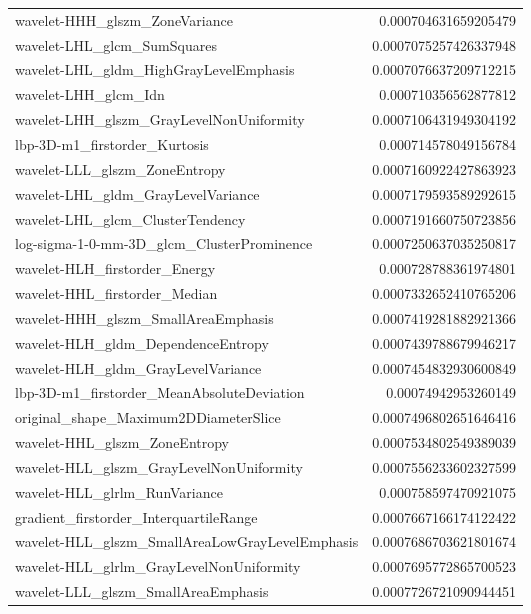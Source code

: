 {\begin{xltabular}[H]{\textwidth}{X r}
        wavelet-HHH\_glszm\_ZoneVariance & 0.000704631659205479 \\
        wavelet-LHL\_glcm\_SumSquares & 0.0007075257426337948 \\
        wavelet-LHL\_gldm\_HighGrayLevelEmphasis & 0.0007076637209712215 \\
        wavelet-LHH\_glcm\_Idn & 0.000710356562877812 \\
        wavelet-LHH\_glszm\_GrayLevelNonUniformity & 0.0007106431949304192 \\
        lbp-3D-m1\_firstorder\_Kurtosis & 0.000714578049156784 \\
        wavelet-LLL\_glszm\_ZoneEntropy & 0.0007160922427863923 \\
        wavelet-LHL\_gldm\_GrayLevelVariance & 0.0007179593589292615 \\
        wavelet-LHL\_glcm\_ClusterTendency & 0.0007191660750723856 \\
        log-sigma-1-0-mm-3D\_glcm\_ClusterProminence & 0.0007250637035250817 \\
        wavelet-HLH\_firstorder\_Energy & 0.000728788361974801 \\
        wavelet-HHL\_firstorder\_Median & 0.0007332652410765206 \\
        wavelet-HHH\_glszm\_SmallAreaEmphasis & 0.0007419281882921366 \\
        wavelet-HLH\_gldm\_DependenceEntropy & 0.0007439788679946217 \\
        wavelet-HLH\_gldm\_GrayLevelVariance & 0.0007454832930600849 \\
        lbp-3D-m1\_firstorder\_MeanAbsoluteDeviation & 0.00074942953260149 \\
        original\_shape\_Maximum2DDiameterSlice & 0.0007496802651646416 \\
        wavelet-HHL\_glszm\_ZoneEntropy & 0.0007534802549389039 \\
        wavelet-HLL\_glszm\_GrayLevelNonUniformity & 0.0007556233602327599 \\
        wavelet-HLL\_glrlm\_RunVariance & 0.000758597470921075 \\
        gradient\_firstorder\_InterquartileRange & 0.0007667166174122422 \\
        wavelet-HLL\_glszm\_SmallAreaLowGrayLevelEmphasis & 0.0007686703621801674 \\
        wavelet-HLL\_glrlm\_GrayLevelNonUniformity & 0.0007695772865700523 \\
        wavelet-LLL\_glszm\_SmallAreaEmphasis & 0.0007726721090944451 \\

\end{xltabular}}
